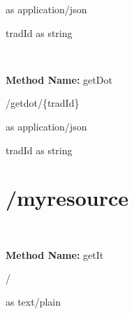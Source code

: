 \begin{response}
 as application/json
\end{response}

\begin{parameter}
tradId as string
\end{parameter}

\

\textbf{Method Name: }getDot
\begin{get}
/getdot/\{tradId\}
\end{get}

\begin{response}
 as application/json
\end{response}

\begin{parameter}
tradId as string
\end{parameter}

\section{/myresource}

\

\textbf{Method Name: }getIt
\begin{get}
/
\end{get}

\begin{response}
 as text/plain
\end{response}

